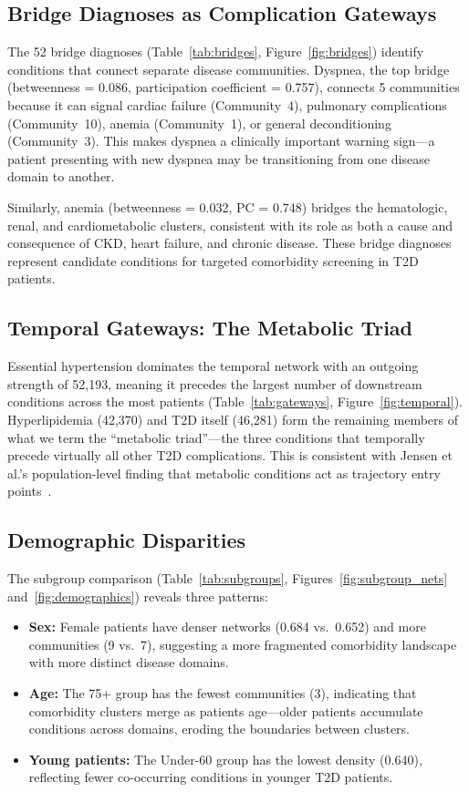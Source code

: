 \documentclass[10pt,twocolumn]{article}
\begin{document}
\subsection{Bridge Diagnoses as Complication Gateways}

The 52 bridge diagnoses (Table~\ref{tab:bridges}, Figure~\ref{fig:bridges}) identify conditions that connect separate disease communities.
Dyspnea, the top bridge (betweenness = 0.086, participation coefficient = 0.757), connects 5 communities because it can signal cardiac failure (Community~4), pulmonary complications (Community~10), anemia (Community~1), or general deconditioning (Community~3).
This makes dyspnea a clinically important warning sign---a patient presenting with new dyspnea may be transitioning from one disease domain to another.

Similarly, anemia (betweenness = 0.032, PC = 0.748) bridges the hematologic, renal, and cardiometabolic clusters, consistent with its role as both a cause and consequence of CKD, heart failure, and chronic disease.
These bridge diagnoses represent candidate conditions for targeted comorbidity screening in T2D patients.

\subsection{Temporal Gateways: The Metabolic Triad}

Essential hypertension dominates the temporal network with an outgoing strength of 52,193, meaning it precedes the largest number of downstream conditions across the most patients (Table~\ref{tab:gateways}, Figure~\ref{fig:temporal}).
Hyperlipidemia (42,370) and T2D itself (46,281) form the remaining members of what we term the ``metabolic triad''---the three conditions that temporally precede virtually all other T2D complications.
This is consistent with Jensen et al.'s population-level finding that metabolic conditions act as trajectory entry points~\cite{jensen2014}.

\subsection{Demographic Disparities}

The subgroup comparison (Table~\ref{tab:subgroups}, Figures~\ref{fig:subgroup_nets} and~\ref{fig:demographics}) reveals three patterns:

\begin{itemize}
    \item \textbf{Sex:} Female patients have denser networks (0.684 vs.\ 0.652) and more communities (9 vs.\ 7), suggesting a more fragmented comorbidity landscape with more distinct disease domains.
    \item \textbf{Age:} The 75+ group has the fewest communities (3), indicating that comorbidity clusters merge as patients age---older patients accumulate conditions across domains, eroding the boundaries between clusters.
    \item \textbf{Young patients:} The Under-60 group has the lowest density (0.640), reflecting fewer co-occurring conditions in younger T2D patients.
\end{itemize}
\end{document}
